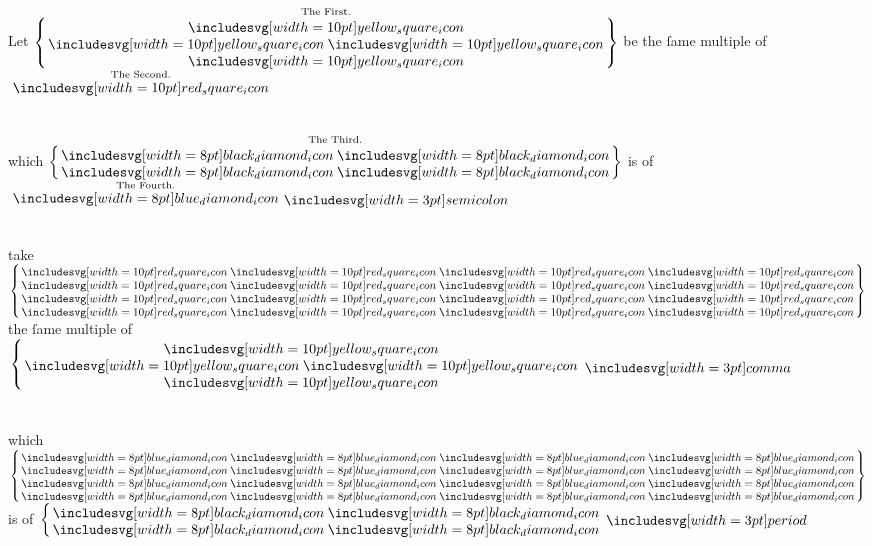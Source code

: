 \documentclass[11pt,preview]{standalone}
\begin{document}
\begin{center}
    Let $\overset{\text{\scriptsize The First.}}{\left\{\hspace{-1.5ex}\begin{array}{c} \yellowsquare \\ \yellowsquares \\ \yellowsquare \end{array}\hspace{-1.5ex}\right\}}$ be the ſame multiple of $\overset{\text{\scriptsize The Second.}}{\redsquare}$\\
    \hfill\\
    \hfill\\
    which $\overset{\text{\scriptsize The Third.}}{\left\{\hspace{-1.5ex}\begin{array}{c} \blackdiamonds \\ \blackdiamonds \end{array}\hspace{-1.5ex}\right\}}$ is of $\overset{\text{\scriptsize The Fourth.}}{\bluediamond} \bsemicolon$\\
    \hfill\\
    \hfill\\
    take $\left\{\hspace{-1.5ex}\begin{array}{c} \redsquares \\ \redsquares \\ \redsquares \\ \redsquares \end{array}\hspace{-1.5ex}\right\}$ the ſame multiple of $\left\{\hspace{-1.5ex}\begin{array}{c} \yellowsquare \\ \yellowsquares \\ \yellowsquare \end{array}\hspace{-1.5ex}\right. \bcomma$\\
    \hfill\\
    \hfill\\
    which $\left\{\hspace{-1.5ex}\begin{array}{c} \bluediamonds \\ \bluediamonds \\ \bluediamonds \\ \bluediamonds \end{array}\hspace{-1.5ex}\right\}$ is of $\left\{\hspace{-1.5ex}\begin{array}{c} \blackdiamonds \\ \blackdiamonds \end{array}\hspace{-1.5ex}\right. \bperiod$
\end{center}
\end{document}
